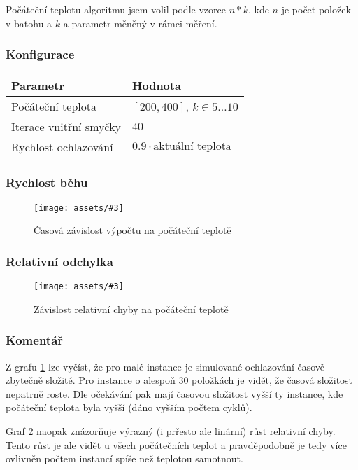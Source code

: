 \documentclass[czech]{article}
\newcommand{\image}[3]{
    \begin{figure}[H]
        \centering
        \texttt{[image: assets/\#3]}
        \caption{#2}
        \label{fig:#1}
    \end{figure}
}
\begin{document}
Počáteční teplotu algoritmu jsem volil podle vzorce $n*k$, kde $n$ je počet položek v batohu a $k$ a parametr měněný v rámci měření.

\subsubsection*{Konfigurace}

\begin{tabular}{ | l | l | }
    \hline
    Parametr & Hodnota \\ \hline \hline
    Počáteční teplota & $[200, 400]$, $k \in 5\dots10$ \\
    Iterace vnitřní smyčky & $40$ \\
    Rychlost ochlazování & $0.9 \cdot \textrm{aktuální teplota}$ \\ \hline
\end{tabular}

\subsubsection*{Rychlost běhu}

\image{dur-initial-temperature}{Časová závislost výpočtu na počáteční teplotě}{dur-initial-temperature.png}

\subsubsection*{Relativní odchylka}

\image{acc-initial-temperature}{Závislost relativní chyby na počáteční teplotě}{acc-initial-temperature.png}

\subsubsection*{Komentář}

Z grafu \ref{fig:dur-initial-temperature} lze vyčíst, že pro malé instance je simulované ochlazování časově zbytečně složité.
Pro instance o alespoň 30 položkách je vidět, že časová složitost nepatrně roste.
Dle očekávání pak mají časovou složitost vyšší ty instance, kde počáteční teplota byla vyšší (dáno vyšším počtem cyklů).

Graf \ref{fig:acc-initial-temperature} naopak znázorňuje výrazný (i prřesto ale linární) růst relativní chyby.
Tento růst je ale vidět u všech počátečních teplot a pravděpodobně je tedy více ovlivněn počtem instancí spíše než teplotou samotnout.
\end{document}
